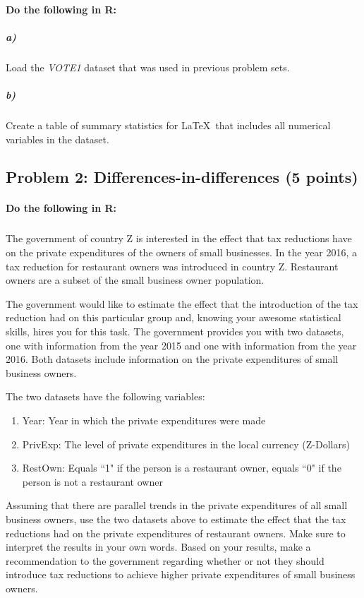 \documentclass[12pt]{article}
\begin{document}
\paragraph{Do the following in R:}

\subparagraph{a)} Load the \textit{VOTE1} dataset that was used in previous problem sets.

\subparagraph{b)} Create a table of summary statistics for \LaTeX \ that includes all numerical variables in the dataset.



\subsection*{Problem 2: Differences-in-differences (5 points)}

\paragraph{Do the following in R:}

\subparagraph{} The government of country Z is interested in the effect that tax reductions have on the private expenditures of the owners of small businesses. In the year 2016, a tax reduction for restaurant owners was introduced in country Z. Restaurant owners are a subset of the small business owner population.

The government would like to estimate the effect that the introduction of the tax reduction had on this particular group and, knowing your awesome statistical skills, hires you for this task. The government provides you with two datasets, one with information from the year 2015 and one with information from the year 2016. Both datasets include information on the private expenditures of small business owners.

The two datasets have the following variables:

\begin{enumerate}
	\item Year: Year in which the private expenditures were made
	\item PrivExp: The level of private expenditures in the local currency (Z-Dollars)
	\item RestOwn: Equals ``1" if the person is a restaurant owner, equals ``0" if the person is not a restaurant owner
\end{enumerate}

Assuming that there are parallel trends in the private expenditures of all small business owners, use the two datasets above to estimate the effect that the tax reductions had on the private expenditures of restaurant owners. Make sure to interpret the results in your own words. Based on your results, make a recommendation to the government regarding whether or not they should introduce tax reductions to achieve higher private expenditures of small business owners.
\end{document}
